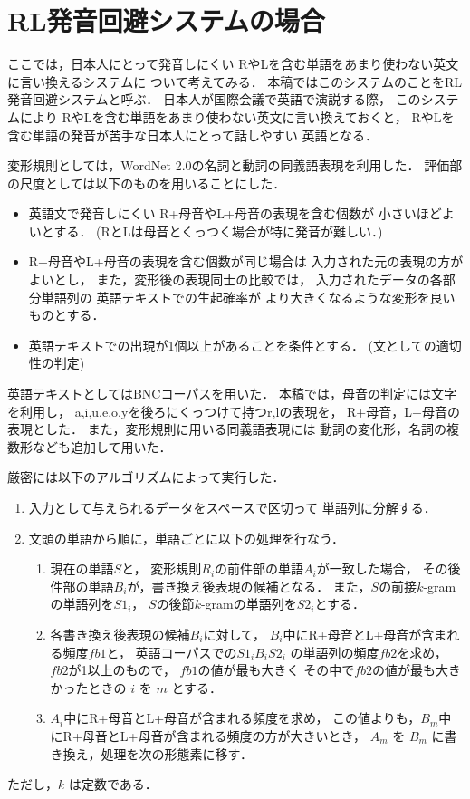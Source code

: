 \section{RL発音回避システムの場合}

ここでは，日本人にとって発音しにくい\cite{eigo_goto,SLA}
RやLを含む単語をあまり使わない英文に言い換えるシステムに
ついて考えてみる．
本稿ではこのシステムのことをRL発音回避システムと呼ぶ．
日本人が国際会議で英語で演説する際，
このシステムにより
RやLを含む単語をあまり使わない英文に言い換えておくと，
RやLを含む単語の発音が苦手な日本人にとって話しやすい
英語となる．

変形規則としては，WordNet 2.0の名詞と動詞の同義語表現を利用した．
評価部の尺度としては以下のものを用いることにした．
\begin{itemize}
\item 
  英語文で発音しにくい
  R+母音やL+母音の表現を含む個数が
  小さいほどよいとする．
  (RとLは母音とくっつく場合が特に発音が難しい．)
\item 
  R+母音やL+母音の表現を含む個数が同じ場合は
  入力された元の表現の方がよいとし，
  また，変形後の表現同士の比較では，
  入力されたデータの各部分単語列の
  英語テキストでの生起確率が
  より大きくなるような変形を良いものとする．
\item 
  英語テキストでの出現が1個以上があることを条件とする．
  (文としての適切性の判定)
\end{itemize}
英語テキストとしてはBNCコーパス\cite{BNC}を用いた．
本稿では，母音の判定には文字を利用し，
a,i,u,e,o,yを後ろにくっつけて持つr,lの表現を，
R+母音，L+母音の表現とした．
また，変形規則に用いる同義語表現には
動詞の変化形，名詞の複数形なども追加して用いた．

厳密には以下のアルゴリズムによって実行した．
\begin{enumerate}
\item 
  入力として与えられるデータをスペースで区切って
  単語列に分解する．

\item 
  文頭の単語から順に，単語ごとに以下の処理を行なう．

  \begin{enumerate}
  \item 
    現在の単語$S$と，
    変形規則$R_i$の前件部の単語$A_i$が一致した場合，
    その後件部の単語$B_i$が，書き換え後表現の候補となる．
    また，$S$の前接$k$-gramの単語列を$S1_i$，
    $S$の後節$k$-gramの単語列を$S2_i$とする．

  \item 
    各書き換え後表現の候補$B_i$に対して，
    $B_i$中にR+母音とL+母音が含まれる頻度$fb1$と，
    英語コーパスでの$S1_i$$B_i$$S2_i$ の単語列の頻度$fb2$を求め，
    $fb2$が1以上のもので，
    $fb1$の値が最も大きく
    その中で$fb2$の値が最も大きかったときの $i$ を $m$ とする．
  
  \item 
    $A_i$中にR+母音とL+母音が含まれる頻度を求め，
    この値よりも，$B_m$中にR+母音とL+母音が含まれる頻度の方が大きいとき，
    $A_m$ を $B_m$ に書き換え，処理を次の形態素に移す．
  \end{enumerate}
\end{enumerate}
ただし，$k$ は定数である．

